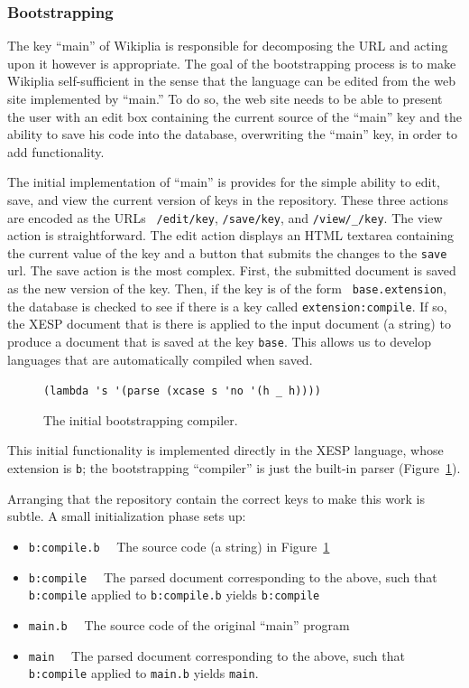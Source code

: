 \documentclass[twocolumn]{article}
\begin{document}
\subsubsection{Bootstrapping}

The key ``main'' of Wikiplia is responsible for decomposing the URL
and acting upon it however is appropriate. The goal of the
bootstrapping process is to make Wikiplia
self-sufficient in the sense that the language
can be edited from the web site implemented by ``main.'' To do so, the
web site needs to be able to present the user with an edit box
containing the current source of the ``main'' key and the ability to
save his code into the database, overwriting the ``main'' key, in
order to add functionality.

The initial implementation of ``main'' is provides for the simple
ability to edit, save, and view the current version of keys in the
repository. These three actions are encoded as the URLs {\tt
/edit/key}, {\tt /save/key}, and {\tt /view/\_/key}. The view action
is straightforward. The edit action displays an HTML
textarea containing the current value of the key and a
button that submits the changes to the {\tt save} url. The save action
is the most complex. First, the submitted document is saved as the new
version of the key. Then, if the key is of the form {\tt
base.extension}, the database is checked to see if there is a key
called {\tt extension:compile}. If so, the XESP document that is there
is applied to the input document (a string) to produce a document that
is saved at the key {\tt base}. This allows us to develop languages
that are automatically compiled when saved.

\begin{figure}
\begin{center}
\verb+(lambda 's '(parse (xcase s 'no '(h _ h))))+
\end{center}
\caption{The initial bootstrapping compiler.} \label{fig:b:compile.b}
\end{figure}

This initial functionality is implemented directly in the XESP
language, whose extension is {\tt b}; the bootstrapping ``compiler''
is just the built-in parser (Figure~\ref{fig:b:compile.b}).

Arranging that the repository contain the correct keys to make this
work is subtle. A small initialization phase sets up:
\begin{itemize}
\item {\tt b:compile.b}$\quad$ 
      The source code (a string) in Figure~\ref{fig:b:compile.b}
\item {\tt b:compile}$\quad$ 
      The parsed document corresponding to the above, such that {\tt b:compile} applied to {\tt b:compile.b} yields {\tt b:compile}
\item {\tt main.b}$\quad$ 
      The source code of the original ``main'' program
\item {\tt main}$\quad$
      The parsed document corresponding to the above, such that {\tt b:compile} applied to {\tt main.b} yields {\tt main}.
\end{itemize}
\end{document}
